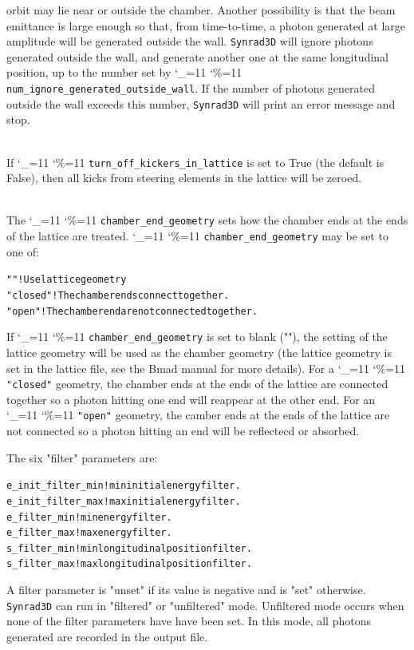 \documentclass[11pt,openany]{report}
\newcommand{\srthree}{\texttt{Synrad3D}\xspace}
\newcommand\ttcmd{\begingroup\catcode`\_=11 \catcode`\%=11 \dottcmd}
\newcommand\dottcmd[1]{\texttt{#1}\endgroup}
\newcommand{\vn}{\ttcmd}
\newcommand{\Newline}{\hfil \\}
\newlength{\ExBeg}
\newlength{\ExEnd}
\newenvironment{example}
  {\vspace{\ExBeg} \begin{alltt}}
  {\end{alltt} \vspace{\ExEnd}}
\begin{document}
\begin{description}
orbit may lie near or outside the chamber. Another possibility is that
the beam emittance is large enough so that, from time-to-time, a
photon generated at large amplitude will be generated outside the
wall. \srthree will ignore photons generated outside the wall, and
generate another one at the same longitudinal position, up to the
number set by \vn{num_ignore_generated_outside_wall}. If the number of
photons generated outside the wall exceeds this number, \srthree will
print an error message and stop.
  \item[\vn{turn_off_kickers_in_lattice}] \Newline
If \vn{turn_off_kickers_in_lattice} is set to True (the default is
False), then all kicks from steering elements in the lattice will be zeroed.
  \item[\vn{chamber_end_geometry}] \Newline
The \vn{chamber_end_geometry} sets how the chamber ends at the ends of the lattice
are treated. \vn{chamber_end_geometry} may be set to one of:
\begin{example}
  ""            ! Use lattice geometry
  "closed"      ! The chamber ends connect together.
  "open"        ! The chamber end are not connected together.
\end{example}
If \vn{chamber_end_geometry} is set to blank (""), the setting of the lattice geometry
will be used as the chamber geometry (the lattice geometry is set in the lattice file,
see the Bmad manual\cite{b:bmad} for more details). For a \vn{"closed"} geometry, the
chamber ends at the ends of the lattice are connected together so a photon hitting one end
will reappear at the other end.  For an \vn{"open"} geometry, the camber ends at the ends
of the lattice are not connected so a photon hitting an end will be reflectecd or absorbed.
\end{description}

The six "filter" parameters are:
\begin{example}
  e_init_filter_min   ! min initial energy filter.
  e_init_filter_max   ! max initial energy filter.
  e_filter_min        ! min energy filter.
  e_filter_max        ! max energy filter.
  s_filter_min        ! min longitudinal position filter.
  s_filter_max        ! max longitudinal position filter.
\end{example}
A filter parameter is "unset" if its value is negative and is "set"
otherwise.  \srthree can run in "filtered" or "unfiltered"
mode. Unfiltered mode occurs when none of the filter parameters have
have been set. In this mode, all photons generated are recorded in
the output file.
\end{document}
